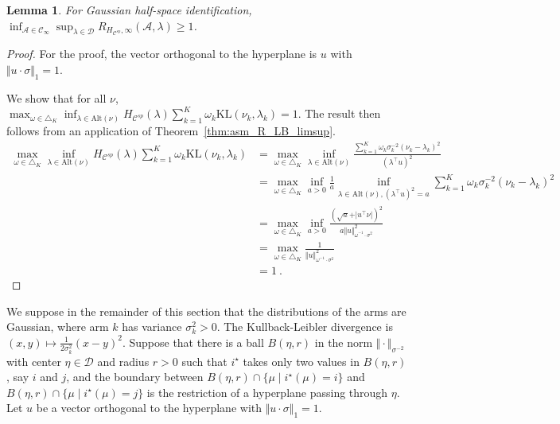 \documentclass{article}
\newcommand{\KL}{\mathrm{KL}}
\newcommand{\alt}{\mathrm{Alt}}
\newtheorem{lemma}{Lemma}
\begin{document}
\begin{lemma}\label{lem:half_space}
For Gaussian half-space identification, $\inf_{\mathcal A \in \mathcal C_\infty}\sup_{\lambda \in \mathcal D} R_{H_{\mathcal C^{sp}}, \infty}(\mathcal A, \lambda) \ge 1$.
\end{lemma}
\begin{proof}
For the proof, the vector orthogonal to the hyperplane is $u$ with $\Vert u \cdot \sigma \Vert_1 = 1$.

We show that for all $\nu$,
$\max_{\omega \in \triangle_K} \inf_{\lambda \in \alt(\nu)}
	H_{\mathcal C^{sp}}(\lambda) \sum_{k=1}^K \omega_{k} \KL(\nu_k, \lambda_k) = 1$.
The result then follows from an application of Theorem~\ref{thm:asm_R_LB_limsup}.
\begin{align*}
\max_{\omega \in \triangle_K} \inf_{\lambda \in \alt(\nu)}
	H_{\mathcal C^{sp}}(\lambda) \sum_{k=1}^K \omega_{k} \KL(\nu_k, \lambda_k) 
&= \max_{\omega \in \triangle_K} \inf_{\lambda \in \alt(\nu)}
	\frac{\sum_{k=1}^K \omega_{k} \sigma_k^{-2} (\nu_k - \lambda_k)^2}{(\lambda^\top u)^2}
\\
&= \max_{\omega \in \triangle_K} \inf_{a>0} \frac{1}{a}\inf_{\lambda \in \alt(\nu), (\lambda^\top u)^2 = a}
	\sum_{k=1}^K \omega_{k} \sigma_k^{-2} (\nu_k - \lambda_k)^2
\\
&= \max_{\omega \in \triangle_K} \inf_{a>0} \frac{(\sqrt{a} + \vert u^\top \nu \vert)^2}{a \Vert u \Vert_{\omega^{-1} \cdot \sigma^{2}}^2}
\\
&= \max_{\omega \in \triangle_K} \frac{1}{\Vert u \Vert_{\omega^{-1} \cdot \sigma^{2}}^2}
\\
&= 1
\: .
\end{align*}
\end{proof}


We suppose in the remainder of this section that the distributions of the arms are Gaussian, where arm $k$ has variance $\sigma_k^2 > 0$. The Kullback-Leibler divergence is $(x,y) \mapsto \frac{1}{2 \sigma_k^2}(x - y)^2$.
Suppose that there is a ball $B(\eta, r)$ in the norm $\Vert \cdot \Vert_{\sigma^{-2}}$ with center $\eta \in \mathcal D$ and radius $r > 0$ such that $i^\star$ takes only two values in $B(\eta, r)$, say $i$ and $j$, and the boundary between $B(\eta, r) \cap \{\mu \mid i^\star(\mu) = i\}$ and $B(\eta, r) \cap \{\mu \mid i^\star(\mu) = j\}$ is the restriction of a hyperplane passing through $\eta$. Let $u$ be a vector orthogonal to the hyperplane with $\Vert u \cdot \sigma \Vert_1 = 1$.
\end{document}
